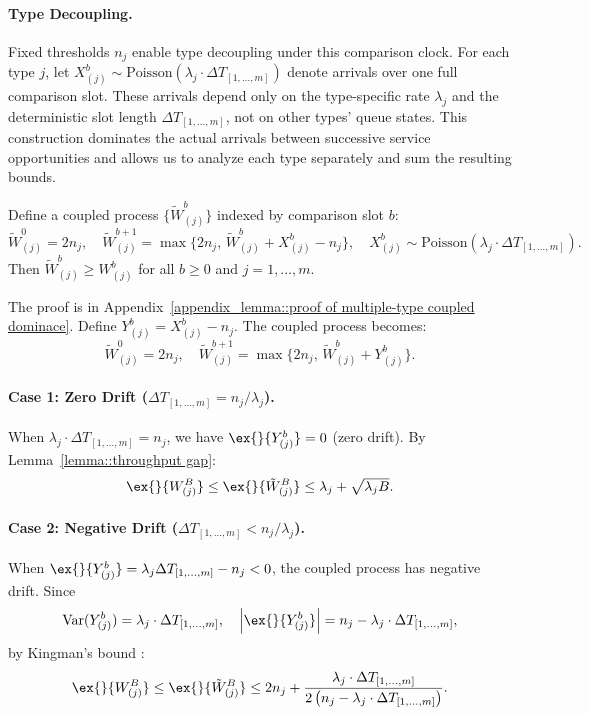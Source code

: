 \paragraph{Type Decoupling.}
Fixed thresholds $n_j$ enable type decoupling under this comparison clock. For each type \(j\), let \(X^b_{(j)} \sim \text{Poisson}(\lambda_j \cdot \Delta T_{[1,\ldots,m]})\) denote arrivals over one full comparison slot. These arrivals depend only on the type-specific rate $\lambda_j$ and the deterministic slot length \(\Delta T_{[1,\ldots,m]}\), not on other types' queue states. This construction dominates the actual arrivals between successive service opportunities and allows us to analyze each type separately and sum the resulting bounds.

\begin{lemma}\label{lemma::multiple-type coupled dominace}
Define a coupled process $\{\tilde{W}^b_{(j)}\}$ indexed by comparison slot $b$:
$$\tilde{W}_{(j)}^0=2n_j, \quad \tilde{W}_{(j)}^{b+1}= \max\{ 2n_j,\, \tilde{W}_{(j)}^b +X_{(j)}^b-n_j \},\quad X^b_{(j)} \sim \text{Poisson}(\lambda_j\cdot \Delta T_{[1,\ldots,m]}).$$
Then $\tilde{W}^b_{(j)}\geq W^b_{(j)}$ for all $b\geq 0$ and $j=1,\ldots,m$.
\end{lemma}
\noindent The proof is in Appendix~\ref{appendix_lemma::proof of multiple-type coupled dominace}. Define $Y^b_{(j)} = X^b_{(j)} - n_j$. The coupled process becomes:
$$\tilde{W}^0_{(j)} = 2n_j,\quad \tilde{W}^{b+1}_{(j)} = \max\{ 2n_j, \, \tilde{W}^b_{(j)}+Y^b_{(j)} \}.$$

\paragraph{Case 1: Zero Drift ($\Delta T_{[1,\ldots,m]} = n_j/\lambda_j$).} When $\lambda_j\cdot \Delta T_{[1,\ldots,m]} = n_j$, we have $\ex{}{Y^b_{(j)}}=0$ (zero drift). By Lemma~\ref{lemma::throughput gap}:
$$\ex{}{W^B_{(j)}}\leq \ex{}{\tilde{W}^B_{(j)}}\leq \lambda_j + \sqrt{\lambda_j B}.$$

\paragraph{Case 2: Negative Drift ($\Delta T_{[1,\ldots,m]} < n_j/\lambda_j$).} When $\ex{}{Y^b_{(j)}}= \lambda_j \Delta T_{[1,\ldots,m]} - n_j <0$, the coupled process has negative drift. Since
$$\text{Var}(Y^b_{(j)}) = \lambda_j \cdot \Delta T_{[1,\ldots,m]},\quad
\left| \ex{}{Y^b_{(j)}} \right| = n_j - \lambda_j\cdot \Delta T_{[1,\ldots,m]},$$
by Kingman's bound \citep{kingman1962queues}:
$$\ex{}{W^B_{(j)}}\leq \ex{}{\tilde{W}^B_{(j)}}\leq 2n_j+ \frac{\lambda_j \cdot \Delta T_{[1,\ldots,m]}}{2\left(n_j - \lambda_j\cdot \Delta T_{[1,\ldots,m]}\right)}.$$

